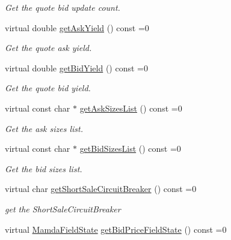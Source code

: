 \begin{CompactItemize}
\begin{CompactList}\small\item\em Get the quote bid update count. \item\end{CompactList}\item 
virtual double \hyperlink{classWombat_1_1MamdaQuoteUpdate_0556f73b7cf3c9bc08032902375d0853}{get\-Ask\-Yield} () const =0
\begin{CompactList}\small\item\em Get the quote ask yield. \item\end{CompactList}\item 
virtual double \hyperlink{classWombat_1_1MamdaQuoteUpdate_fa0ade5605db4d673d9a46883983f28f}{get\-Bid\-Yield} () const =0
\begin{CompactList}\small\item\em Get the quote bid yield. \item\end{CompactList}\item 
virtual const char $\ast$ \hyperlink{classWombat_1_1MamdaQuoteUpdate_05320bcb2d86d1b56d023fe36d642605}{get\-Ask\-Sizes\-List} () const =0
\begin{CompactList}\small\item\em Get the ask sizes list. \item\end{CompactList}\item 
virtual const char $\ast$ \hyperlink{classWombat_1_1MamdaQuoteUpdate_5bf842d9bbf0ee4fba7add0e3fd14254}{get\-Bid\-Sizes\-List} () const =0
\begin{CompactList}\small\item\em Get the bid sizes list. \item\end{CompactList}\item 
virtual char \hyperlink{classWombat_1_1MamdaQuoteUpdate_1bbdca5731cb0581db95e8b07d7cb81a}{get\-Short\-Sale\-Circuit\-Breaker} () const =0
\begin{CompactList}\small\item\em get the Short\-Sale\-Circuit\-Breaker \item\end{CompactList}\item 
virtual \hyperlink{namespaceWombat_93aac974f2ab713554fd12a1fa3b7d2a}{Mamda\-Field\-State} \hyperlink{classWombat_1_1MamdaQuoteUpdate_6a37beceb454a5c413d322008f9b77a9}{get\-Bid\-Price\-Field\-State} () const =0

\end{CompactItemize}
